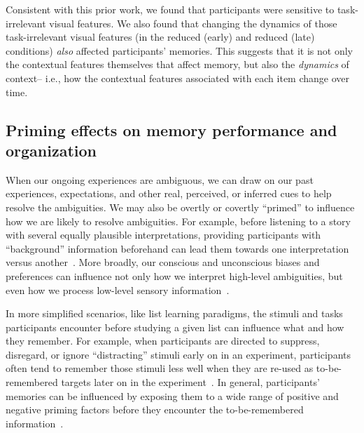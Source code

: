 \documentclass[11pt]{article}
\begin{document}
Consistent with this prior work, we found that participants were sensitive to
task-irrelevant visual features. We also found that changing the dynamics of
those task-irrelevant visual features (in the reduced (early) and reduced
(late) conditions) \textit{also} affected participants' memories. This suggests
that it is not only the contextual features themselves that affect memory, but
also the \textit{dynamics} of context-- i.e., how the contextual features
associated with each item change over time.

\subsection*{Priming effects on memory performance and organization}


When our ongoing experiences are ambiguous, we can draw on our past
experiences, expectations, and other real, perceived, or inferred cues to help
resolve the ambiguities. We may also be overtly or covertly ``primed'' to
influence how we are likely to resolve ambiguities. For example, before
listening to a story with several equally plausible interpretations, providing
participants with ``background'' information beforehand can lead them towards
one interpretation versus another~\citep{YeshEtal17}. More broadly, our
conscious and unconscious biases and preferences can influence not only how we
interpret high-level ambiguities, but even how we process low-level sensory
information~\citep{KataEtal23}.

In more simplified scenarios, like list learning paradigms, the stimuli and
tasks participants encounter before studying a given list can influence what
and how they remember. For example, when participants are directed to suppress,
disregard, or ignore ``distracting'' stimuli early on in an experiment,
participants often tend to remember those stimuli less well when they are
re-used as to-be-remembered targets later on in the experiment~\citep{Tipp85}.
In general, participants' memories can be influenced by exposing them to a wide
range of positive and negative priming factors before they encounter the
to-be-remembered information~\citep{BaloEtal92, ClayChat89, Donn88, FlexTulv82,
GottEtal12, HuanEtal04, Hube08, HubeEtal01, McNa94, Neel77, Rabi86, TulvScha91,
WatkEtal92, WiggMart98}.
\end{document}
